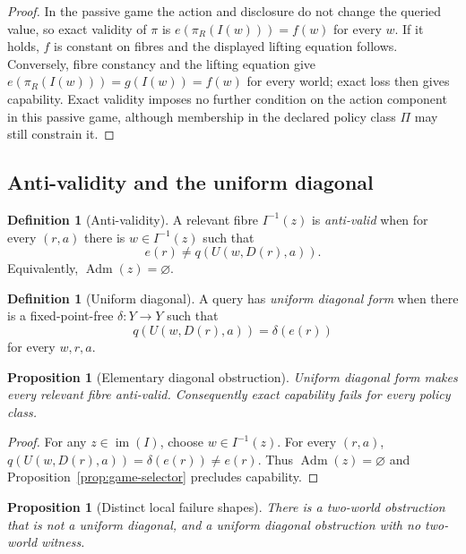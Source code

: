 \documentclass[11pt]{article}
\theoremstyle{plain}
\newtheorem{proposition}[theorem]{Proposition}
\theoremstyle{definition}
\newtheorem{definition}[theorem]{Definition}
\theoremstyle{remark}
\newcommand{\im}{\operatorname{im}}
\newcommand{\Adm}{\operatorname{Adm}}
\begin{document}
\begin{proof}
In the passive game the action and disclosure do not change the queried value,
so exact validity of $\pi$ is
$e(\pi_R(I(w)))=f(w)$ for every $w$. If it holds, $f$ is constant on fibres and
the displayed lifting equation follows. Conversely, fibre constancy and the
lifting equation give $e(\pi_R(I(w)))=g(I(w))=f(w)$ for every world; exact loss
then gives capability. Exact validity imposes no further condition on the action
component in this passive game, although membership in the declared policy class
$\Pi$ may still constrain it.
\end{proof}

\subsection{Anti-validity and the uniform diagonal}

\begin{definition}[Anti-validity]\label{def:antivalid}
A relevant fibre $I^{-1}(z)$ is \emph{anti-valid} when for every $(r,a)$ there
is $w\in I^{-1}(z)$ such that
\[
e(r)\ne q(U(w,D(r),a)).
\]
Equivalently, $\Adm(z)=\varnothing$.
\end{definition}

\begin{definition}[Uniform diagonal]\label{def:diag}
A query has \emph{uniform diagonal form} when there is a fixed-point-free
$\delta:Y\to Y$ such that
\[
q(U(w,D(r),a))=\delta(e(r))
\]
for every $w,r,a$.
\end{definition}

\begin{proposition}[Elementary diagonal obstruction]\label{prop:diagonal}
Uniform diagonal form makes every relevant fibre anti-valid. Consequently exact
capability fails for every policy class.
\end{proposition}

\begin{proof}
For any $z\in\im(I)$, choose $w\in I^{-1}(z)$. For every $(r,a)$,
$q(U(w,D(r),a))=\delta(e(r))\ne e(r)$. Thus $\Adm(z)=\varnothing$ and
Proposition~\ref{prop:game-selector} precludes capability.
\end{proof}

\begin{proposition}[Distinct local failure shapes]\label{prop:failure-shapes}
There is a two-world obstruction that is not a uniform diagonal, and a uniform
diagonal obstruction with no two-world witness.
\end{proposition}
\end{document}
